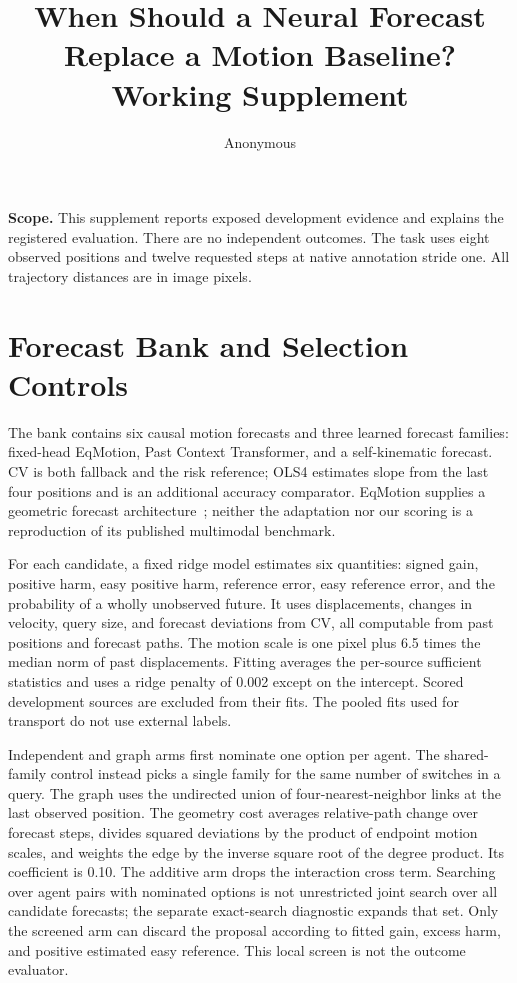 \documentclass[10pt,twocolumn,letterpaper]{article}
\title{When Should a Neural Forecast Replace a Motion Baseline?\\Working Supplement}
\author{Anonymous}
\begin{document}
\maketitle

\noindent\textbf{Scope.}
This supplement reports exposed development evidence and explains the
registered evaluation. There are no independent outcomes. The task uses
eight observed positions and twelve requested steps at native annotation
stride one. All trajectory distances are in image pixels.

\section{Forecast Bank and Selection Controls}
The bank contains six causal motion forecasts and three learned
forecast families: fixed-head EqMotion, Past Context Transformer,
and a self-kinematic forecast. CV is both fallback and the risk
reference; OLS4 estimates slope from the last four positions and is
an additional accuracy comparator. EqMotion supplies a geometric
forecast architecture~\cite{eqmotion}; neither the adaptation nor
our scoring is a reproduction of its published multimodal benchmark.

For each candidate, a fixed ridge model estimates six quantities:
signed gain, positive harm, easy positive harm, reference error,
easy reference error, and the probability of a wholly unobserved
future. It uses displacements, changes in velocity, query size,
and forecast deviations from CV, all computable from past positions
and forecast paths. The motion scale is one pixel plus 6.5 times
the median norm of past displacements. Fitting averages the
per-source sufficient statistics and uses a ridge penalty of
0.002 except on the intercept. Scored development sources are
excluded from their fits. The pooled fits used for transport do
not use external labels.

Independent and graph arms first nominate one option per agent.
The shared-family control instead picks a single family for the
same number of switches in a query. The graph uses the undirected
union of four-nearest-neighbor links at the last observed position.
The geometry cost averages relative-path change over forecast
steps, divides squared deviations by the product of endpoint
motion scales, and weights the edge by the inverse square root
of the degree product. Its coefficient is 0.10. The additive
arm drops the interaction cross term. Searching over agent
pairs with nominated options is not unrestricted joint search
over all candidate forecasts; the separate exact-search
diagnostic expands that set. Only the screened arm can
discard the proposal according to fitted gain, excess harm,
and positive estimated easy reference. This local screen is
not the outcome evaluator.
\end{document}

